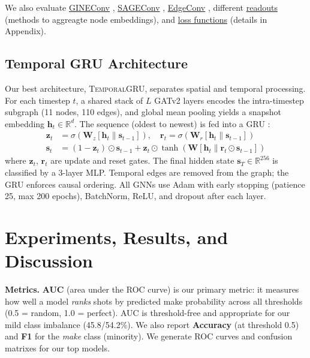 \documentclass{article}
\begin{document}
We also evaluate \hyperlink{app:gineconv}{GINEConv} \citep{hu2020gine}, \hyperlink{app:sageconv}{SAGEConv} \citep{hamilton2017sage}, \hyperlink{app:edgeconv}{EdgeConv} \citep{wang2019edgeconv}, different \hyperlink{app:readouts}{readouts} (methods to aggreagte node embeddings), and \hyperlink{app:losses}{loss functions} (details in Appendix).

\subsection{Temporal GRU Architecture}

Our best architecture, \textsc{TemporalGRU}, separates spatial and temporal processing. For each timestep $t$, a shared stack of $L$ GATv2 layers encodes the intra-timestep subgraph (11 nodes, 110 edges), and global mean pooling yields a snapshot embedding $\mathbf{h}_t \in \mathbb{R}^d$. The sequence (oldest to newest) is fed into a GRU \citep{cho2014gru}:
\begin{align}
\mathbf{z}_t &= \sigma(\mathbf{W}_z[\mathbf{h}_t \| \mathbf{s}_{t-1}]), \quad \mathbf{r}_t = \sigma(\mathbf{W}_r[\mathbf{h}_t \| \mathbf{s}_{t-1}]) \\
\mathbf{s}_t &= (1\!-\!\mathbf{z}_t)\odot\mathbf{s}_{t-1} + \mathbf{z}_t\odot\tanh(\mathbf{W}[\mathbf{h}_t \| \mathbf{r}_t\odot\mathbf{s}_{t-1}])
\end{align}
where $\mathbf{z}_t$, $\mathbf{r}_t$ are update and reset gates. The final hidden state $\mathbf{s}_T \in \mathbb{R}^{256}$ is classified by a 3-layer MLP. Temporal edges are removed from the graph; the GRU enforces causal ordering. All GNNs use Adam with early stopping (patience 25, max 200 epochs), BatchNorm, ReLU, and dropout after each layer.

\section{Experiments, Results, and Discussion}

\textbf{Metrics.} \textbf{AUC} (area under the ROC curve) is our primary metric: it measures how well a model \emph{ranks} shots by predicted make probability across all thresholds (0.5 = random, 1.0 = perfect). AUC is threshold-free and appropriate for our mild class imbalance (45.8/54.2\%). We also report \textbf{Accuracy} (at threshold 0.5) and \textbf{F1} for the \emph{make} class (minority). We generate ROC curves and confusion matrixes for our top models.
\end{document}
